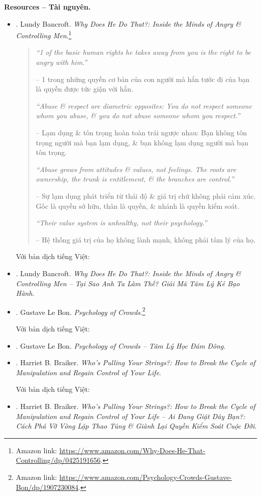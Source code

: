 \documentclass[12pt]{article}
\begin{document}
\noindent\textbf{\textsf{Resources -- Tài nguyên.}}
\begin{itemize}
	\item \cite{Bancroft_why_he_do}. {\sc Lundy Bancroft}. {\it Why Does He Do That?: Inside the Minds of Angry \& Controlling Men}.\footnote{Amazon link: \url{https://www.amazon.com/Why-Does-He-That-Controlling/dp/0425191656}.}
	\begin{quotation}
		{\it``1 of the basic human rights he takes away from you is the right to be angry with him.''}
		
		-- 1 trong những quyền cơ bản của con người mà hắn tước đi của bạn là quyền được tức giận với hắn.
		
		{\it``Abuse \& respect are diametric opposites: You do not respect someone whom you abuse, \& you do not abuse someone whom you respect.''}
		
		-- Lạm dụng \& tôn trọng hoàn toàn trái ngược nhau: Bạn không tôn trọng người mà bạn lạm dụng, \& bạn không lạm dụng người mà bạn tôn trọng.
		
		{\it``Abuse grows from attitudes \& values, not feelings. The roots are ownership, the trunk is entitlement, \& the branches are control.''}
			
		-- Sự lạm dụng phát triển từ thái độ \& giá trị chứ không phải cảm xúc. Gốc là quyền sở hữu, thân là quyền, \& nhánh là quyền kiểm soát.
		
		{\it``Their value system is unhealthy, not their psychology.''}
		
		-- Hệ thống giá trị của họ không lành mạnh, không phải tâm lý của họ.
	\end{quotation}
	Với bản dịch tiếng Việt:
	\item \cite{Bancroft_why_he_do_VN}. {\sc Lundy Bancroft}. {\it Why Does He Do That?: Inside the Minds of Angry \& Controlling Men -- Tại Sao Anh Ta Làm Thế? Giải Mã Tâm Lý Kẻ Bạo Hành}.
	\item \cite{Bon_crowd_psychology}. {\sc Gustave Le Bon}. {\it Psychology of Crowds}.\footnote{Amazon link: \url{https://www.amazon.com/Psychology-Crowds-Gustave-Bon/dp/1907230084}.}
	
	Với bản dịch tiếng Việt:
	\item \cite{Bon_crowd_psychology_VN}. {\sc Gustave Le Bon}. {\it Psychology of Crowds -- Tâm Lý Học Đám Đông}.
	\item \cite{Braiker_string}. {\sc Harriet B. Braiker}. {\it Who's Pulling Your Strings?: How to Break the Cycle of Manipulation and Regain Control of Your Life}.
	
	Với bản dịch tiếng Việt:
	\item \cite{Braiker_string}. {\sc Harriet B. Braiker}. {\it Who's Pulling Your Strings?: How to Break the Cycle of Manipulation and Regain Control of Your Life -- Ai Đang Giật Dây Bạn?: Cách Phá Vỡ Vòng Lặp Thao Túng \& Giành Lại Quyền Kiểm Soát Cuộc Đời}.
\end{itemize}
\end{document}
